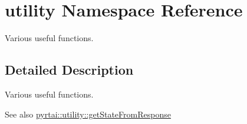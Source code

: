 \hypertarget{namespaceutility}{
\section{utility \-Namespace \-Reference}
\label{namespaceutility}
}


\-Various useful functions.  




\subsection{\-Detailed \-Description}
\-Various useful functions. \begin{DoxySeeAlso}{\-See also}
\hyperlink{namespacepyrtai_1_1utility_a58a6904c0a7c5890e90137abd905feac}{pyrtai\-::utility\-::get\-State\-From\-Response} 
\end{DoxySeeAlso}
